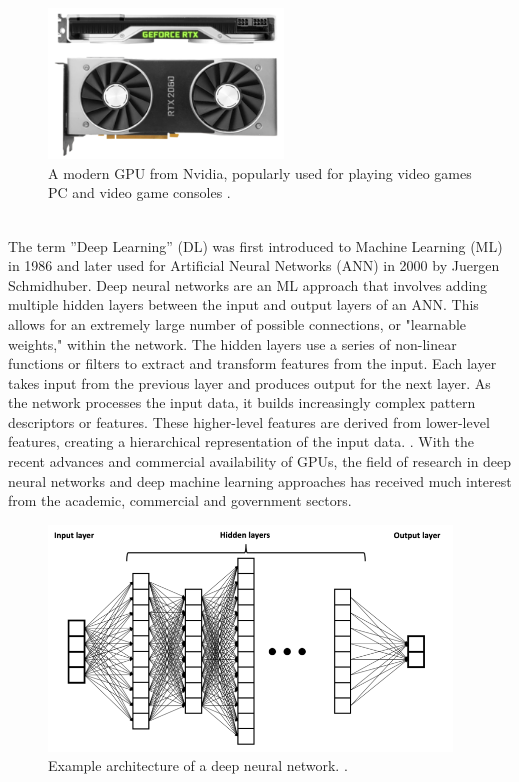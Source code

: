 \begin{figure}[H]
    \centering
    \includegraphics[width=\textwidth,height=4cm,keepaspectratio=true]{src/Images/RTX_2080FE.png}
    \caption{
         A modern GPU from Nvidia, popularly used for playing video games PC and video game consoles \cite{gpu_img}. 
    }
\end{figure}
\\

The term ”Deep Learning” (DL) was first introduced to Machine Learning (ML) in 1986 and later used for Artificial Neural Networks (ANN) in 2000 by Juergen Schmidhuber. Deep neural networks are an ML approach that involves adding multiple hidden layers between the input and output layers of an ANN. This allows for an extremely large number of possible connections, or "learnable weights," within the network. The hidden layers use a series of non-linear functions or filters to extract and transform features from the input. Each layer takes input from the previous layer and produces output for the next layer. As the network processes the input data, it builds increasingly complex pattern descriptors or features. These higher-level features are derived from lower-level features, creating a hierarchical representation of the input data. \cite{minar2018recent}. With the recent advances and commercial availability of GPUs, the field of research in deep neural networks and deep machine learning approaches has received much interest from the academic, commercial and government sectors.  
\begin{figure}[H]
    \centering
    \includegraphics[width=\textwidth,height=6cm,keepaspectratio=true]{src/Images/Example_of_a_deep_neural_network.png}
    \caption{
    Example architecture of a deep neural network. \cite{dnn_img}. 
    }
\end{figure}
\\